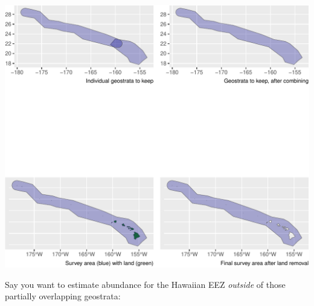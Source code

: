\documentclass[
]{book}
\newenvironment{Shaded}{\begin{snugshade}}{\end{snugshade}}
\newcommand{\AttributeTok}[1]{\textcolor[rgb]{0.77,0.63,0.00}{#1}}
\newcommand{\ConstantTok}[1]{\textcolor[rgb]{0.00,0.00,0.00}{#1}}
\newcommand{\FunctionTok}[1]{\textcolor[rgb]{0.00,0.00,0.00}{#1}}
\newcommand{\NormalTok}[1]{#1}
\newcommand{\OtherTok}[1]{\textcolor[rgb]{0.56,0.35,0.01}{#1}}
\newcommand{\SpecialCharTok}[1]{\textcolor[rgb]{0.00,0.00,0.00}{#1}}
\newcommand{\StringTok}[1]{\textcolor[rgb]{0.31,0.60,0.02}{#1}}
\begin{document}
\includegraphics{figures/unnamed-chunk-257-1.pdf}

Say you want to estimate abundance for the Hawaiian EEZ \emph{outside} of those partially overlapping geostrata:

\begin{Shaded}
\end{Shaded}
\end{document}
